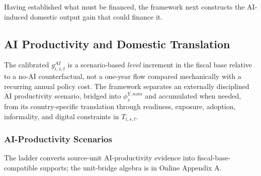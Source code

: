\documentclass[11pt,a4paper]{article}
\begin{document}
Having established what must be financed, the framework next constructs the AI-induced domestic output gain that could finance it.

\subsection{AI Productivity and Domestic Translation}\label{sec:ai_shocks}

The calibrated $g^{AI}_{i,s,t}$ is a scenario-based \emph{level} increment in the fiscal base relative to a no-AI counterfactual, not a one-year flow compared mechanically with a recurring annual policy cost. The framework separates an externally disciplined AI productivity scenario, bridged into $\phi^{Y,nom}_s$ and accumulated when needed, from its country-specific translation through readiness, exposure, adoption, informality, and digital constraints in $T_{i,s,t}$.

\subsubsection{AI-Productivity Scenarios}\label{subsec:phi_ladder_main}

The ladder converts source-unit AI-productivity evidence into fiscal-base-compatible supports; the unit-bridge algebra is in Online Appendix A.
\end{document}
